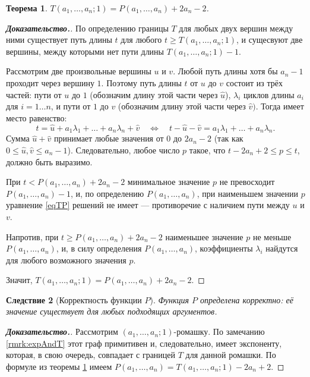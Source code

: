 \documentclass[12pt]{article}
\newtheorem{theorem}{Теорема}[section]
\newtheorem{corollary}[theorem]{Следствие}
\begin{document}
\begin{theorem}
\label{thTP}
$T(a_1, \dots, a_n; 1) = P(a_1, \dots, a_n) + 2a_n - 2$.
\end{theorem}
\begin{proof}[\textbf{Доказательство.}]
По определению границы $T$ для любых двух вершин между ними существует путь длины $t$ для любого $t \ge T(a_1, \dots, a_n; 1)$, и сущесвуют две вершины, между которыми нет пути длины $T(a_1, \dots, a_n; 1) - 1$.

Рассмотрим две произвольные вершины $u$ и $v$. Любой путь длины хотя бы $a_n - 1$ проходит через вершину $1$. Поэтому путь длины $t$ от $u$ до $v$ состоит из трёх частей: пути от $u$ до $1$ (обозначим длину этой части через $\hat{u}$), $\lambda_i$ циклов длины $a_i$ для $i = 1\dots n$, и пути от $1$ до $v$ (обозначим длину этой части через $\hat{v})$. Тогда имеет место равенство:
\begin{equation*}
    t = \hat{u} + a_1 \lambda_1 + \dots + a_n \lambda_n + \hat{v} \quad \Longleftrightarrow \quad t - \hat{u} - \hat{v} = a_1 \lambda_1 + \dots + a_n \lambda_n.
\end{equation*}
Сумма $\hat{u} + \hat{v}$ принимает любые значения от $0$ до $2a_n - 2$ (так как $0 \le \hat{u}, \hat{v} \le a_n - 1$). Следовательно, любое число $p$ такое, что $t - 2a_n + 2 \le p \le t$, должно быть выразимо.

При $t < P(a_1, \dots, a_n) + 2a_n - 2$ минимальное значение $p$ не превосходит $P(a_1, \dots, a_n) - 1$, и, по определению $P(a_1, \dots, a_n)$, при наименьшем значении $p$ уравнение \ref{eqTP} решений не имеет --- противоречие с наличием пути между $u$ и $v$.

Напротив, при $t \ge P(a_1, \dots, a_n) + 2a_n - 2$ наименьшее значение $p$ не меньше $P(a_1, \dots, a_n)$, и, в силу определения $P(a_1, \dots, a_n)$, коэффициенты $\lambda_i$ найдутся для любого возможного значения $p$.

Значит, $T(a_1, \dots, a_n; 1) = P(a_1, \dots, a_n) + 2a_n - 2$.
\end{proof}

\begin{corollary}[Корректность функции $P$]
Функция $P$ определена корректно: её значение существует для любых подходящих аргументов.
\end{corollary}
\begin{proof}[\textbf{Доказательство.}]
Рассмотрим $(a_1, \dots, a_n; 1)$-ромашку. По замечанию \ref{rmrk:expAndT} этот граф примитивен и, следовательно, имеет экспоненту, которая, в свою очередь, совпадает с границей $T$ для данной ромашки. По формуле из теоремы \ref{thTP} имеем $P(a_1, \dots, a_n) = T(a_1, \dots, a_n; 1) - 2a_n + 2$.
\end{proof}
\end{document}
